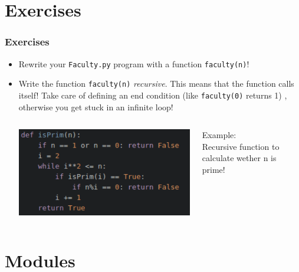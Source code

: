 \documentclass{beamer}
\begin{document}
\section{Exercises}

\begin{frame}
\frametitle{Exercises}
	\begin{itemize}
		\item Rewrite your \texttt{Faculty.py} program with a function \texttt{faculty(n)}!
		\item Write the function \texttt{faculty(n)} \textit{recursive}. This means that the function calls itself! Take care of defining an end condition (like \texttt{faculty(0)} returns 1) , otherwise you get stuck in an infinite loop! \\
		\begin{columns}[T]
		\begin{column}[T]{6cm}
			\includegraphics[width = 1\textwidth]{recursivePrim.pdf}
		\end{column}
		\begin{column}[T]{4cm}
			Example: \\
			Recursive function to calculate wether n is prime! 
		\end{column}
		\end{columns}
	\end{itemize}
\end{frame}

\section{Modules}
\end{document}
